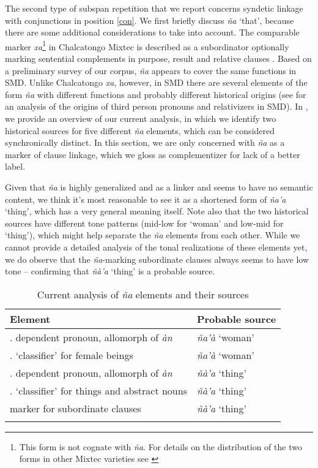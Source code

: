 \documentclass[output=paper]{langscibook}
\begin{document}
The second type of subspan repetition that we report concerns syndetic linkage with conjunctions in position \ref{con}.
We first briefly discuss \emph{ña} `that', because there are some additional considerations to take into account.
The comparable marker \textit{xa}\footnote{This form is not cognate with \textit{ña}. For details on the distribution of the two forms in other Mixtec varieties see \citet{hollenbach1995cuatro}} in Chalcatongo Mixtec is described as a subordinator optionally marking sentential complements in purpose, result and relative clauses \citep[153--160]{macaulay1996grammar}. 
Based on a preliminary survey of our corpus, \textit{ña} appears to cover the same functions in SMD.
Unlike Chalcatongo \textit{xa}, however, in SMD there are several elements of the form \emph{ña} with different functions and probably different historical origins (see \citealt{ventayol2021classifiers} for an analysis of the origins of third person pronouns and relativizers in SMD).
In , we provide an overview of our current analysis, in which we identify two historical sources for five different \textit{ña} elements, which can be considered synchronically distinct. In this section, we are only concerned with \textit{ña} as a marker of clause linkage, which we gloss as complementizer for lack of a better label.

Given that \emph{ña} is highly generalized and as a linker and  seems to have no semantic content, we think it's most reasonable to see it as a shortened form of \emph{ña'a} `thing', which has a very general meaning itself.
Note also that the two historical sources have different tone patterns (mid-low for `woman' and low-mid for `thing'), which might help separate the \textit{ña} elements from each other. While we cannot provide a detailed analysis of the tonal realizations of these elements yet, we do observe that the \textit{ña}-marking subordinate clauses always seems to have low tone -- confirming that \emph{ñà'a} `thing' is a probable source.

\begin{table}
    \caption{Current analysis of \textit{ña} elements and their sources}
    \label{tab:naelements}
    \centering
    \begin{tabularx}{\textwidth}{Xl}\lsptoprule
	Element	& Probable source \\ \midrule
	\Tsg.\F{} dependent pronoun, allomorph of \emph{àn} 	& \emph{ña'à} `woman' \\
	\Clf.\Tsg{} `classifier' for female beings				    & \emph{ña'à} `woman' \\
	\Tsg.\Thing{} dependent pronoun, allomorph of \emph{àn}   	& \emph{ñà'a} `thing' \\
	\Clf.\Thing{} `classifier' for things and abstract nouns & \emph{ñà'a} `thing' \\
	\Compl{} marker for subordinate clauses & \emph{ñà'a} `thing' \\ \lspbottomrule
    \end{tabularx}
\end{table}
\end{document}
